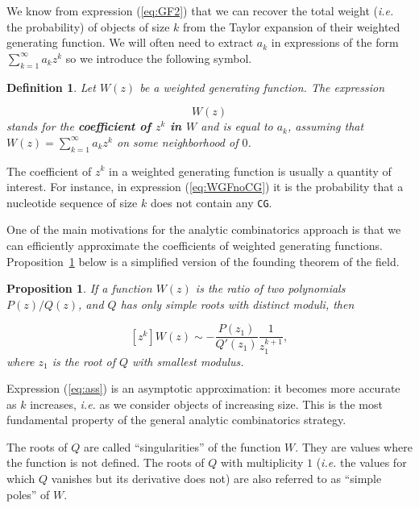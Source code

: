 \documentclass{article}
\newtheorem{definition}{Definition}
\newtheorem{proposition}{Proposition}
\begin{document}
We know from expression (\ref{eq:GF2}) that we can recover the total
weight (\textit{i.e.} the probability) of objects of size $k$ from the
Taylor expansion of their weighted generating function. We will often need
to extract $a_k$ in expressions of the form $\sum_{k=1}^\infty a_k z^k$ so
we introduce the following symbol.

\begin{definition}
Let $W(z)$ be a weighted generating function. The expression

\begin{equation*}
[z^k]W(z)
\end{equation*}
stands for the \textbf{coefficient of $z^k$ in $W$} and is equal to $a_k$,
assuming that $W(z) = \sum_{k=1}^\infty a_k z^k$ on some neighborhood of
$0$.
\end{definition}

The coefficient of $z^k$ in a weighted generating function is usually a
quantity of interest. For instance, in expression (\ref{eq:WGFnoCG}) it
is the probability that a nucleotide sequence of size $k$ does not contain
any \texttt{CG}.

One of the main motivations for the analytic combinatorics approach is
that we can efficiently approximate the coefficients of weighted
generating functions. Proposition~\ref{th:ass} below is a simplified
version of the founding theorem of the field.


\begin{proposition}
\label{th:ass}
If a function $W(z)$ is the ratio of two polynomials $P(z)/Q(z)$, and $Q$
has only simple roots with distinct \textit{moduli}, then

\begin{equation}
\label{eq:ass}
[z^k]W(z) \sim
-\frac{P(z_1)}{Q'(z_1)}\frac{1}{z_1^{k+1}},
\end{equation}
where $z_1$ is the root of $Q$ with smallest \textit{modulus}.
\end{proposition}

Expression (\ref{eq:ass}) is an asymptotic approximation: it becomes more
accurate as $k$ increases, \textit{i.e.} as we consider objects of
increasing size. This is the most fundamental property of the general
analytic combinatorics strategy.

The roots of $Q$ are called ``singularities'' of the function $W$. They
are values where the function is not defined. The roots of $Q$ with
multiplicity $1$ (\textit{i.e.} the values for which $Q$ vanishes but its
derivative does not) are also referred to as ``simple poles'' of $W$.
\end{document}
